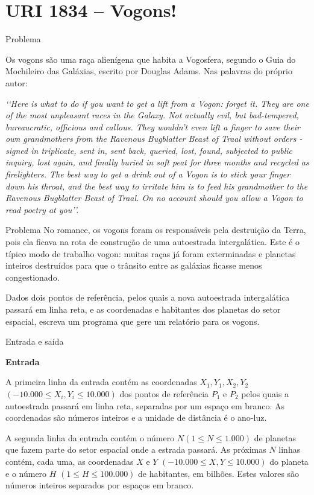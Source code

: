 \section{URI 1834 -- Vogons!}

\begin{frame}[fragile]{Problema}

Os vogons são uma raça alienígena que habita a Vogosfera, segundo o Guia do Mochileiro das Galáxias, escrito por Douglas Adams. Nas palavras do próprio autor:

\textit{
\lq\lq Here is what to do if you want to get a lift from a Vogon: forget it. They are one of the most unpleasant races in the Galaxy. Not actually evil, but bad-tempered, bureaucratic, officious and callous. They wouldn't even lift a finger to save their own grandmothers from the Ravenous Bugblatter Beast of Traal without orders - signed in triplicate, sent in, sent back, queried, lost, found, subjected to public inquiry, lost again, and finally buried in soft peat for three months and recycled as firelighters. The best way to get a drink out of a Vogon is to stick your finger down his throat, and the best way to irritate him is to feed his grandmother to the Ravenous Bugblatter Beast of Traal. On no account should you allow a Vogon to read poetry at you\rq\rq.
}

\end{frame}

\begin{frame}[fragile]{Problema}
No romance, os vogons foram os responsáveis pela destruição da Terra, pois ela ficava na rota de construção de uma autoestrada intergalática. Este é o típico modo de trabalho vogon: muitas raças já foram exterminadas e planetas inteiros destruídos para que o trânsito entre as galáxias ficasse menos congestionado.

Dados dois pontos de referência, pelos quais a nova autoestrada intergalática passará em linha reta, e as coordenadas e habitantes dos planetas do setor espacial, escreva um programa que gere um relatório para os vogons.

\end{frame}

\begin{frame}[fragile]{Entrada e saída}

\textbf{Entrada}

A primeira linha da entrada contém as coordenadas $X_1, Y_1, X_2, Y_2$ $(-10.000 \leq X_i, Y_i \leq 10.000)$ 
dos pontos de referência $P_1$ e $P_2$ pelos quais a autoestrada passará em linha reta, separadas por um espaço em branco. As coordenadas são números inteiros e a unidade de distância é o ano-luz.

A segunda linha da entrada contém o número $N (1 \leq N \leq 1.000)$ de planetas que fazem parte do 
setor espacial onde a estrada passará. As próximas $N$ linhas contém, cada uma, as coordenadas $X$ e $Y$ $(-10.000 \leq X, Y \leq 10.000)$ do planeta e o número $H$ $(1 \leq H \leq 100.000)$ de habitantes, em bilhões. Estes valores são números inteiros separados por espaços em branco.
\end{frame}

